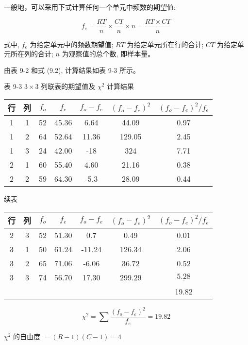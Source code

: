\documentclass[10pt]{article}
\begin{document}
\begin{CJK*}{UTF8}{bsmi}
一般地，可以采用下式计算任何一个单元中频数的期望值:


\begin{equation*}
f_{e}=\frac{R T}{n} \times \frac{C T}{n} \times n=\frac{R T \times C T}{n} \tag{9.2}
\end{equation*}


式中, $f_{e}$ 为给定单元中的频数期望值; $R T$ 为给定单元所在行的合计; $C T$ 为给定单元所在列的合计; $n$ 为观察值的总个数, 即样本量。

由表 9-2 和式 (9.2), 计算结果如表 9-3 所示。

表 9-3 $3 \times 3$ 列联表的期望值及 $\chi^{2}$ 计算结果

\begin{center}
\begin{tabular}{ccccccc}
\hline
行 & 列 & $f_{o}$ & $f_{e}$ & $f_{o}-f_{e}$ & $\left(f_{o}-f_{e}\right)^{2}$ & $\left(f_{o}-f_{e}\right)^{2} / f_{e}$ \\
\hline
1 & 1 & 52 & 45.36 & 6.64 & 44.09 & 0.97 \\
1 & 2 & 64 & 52.64 & 11.36 & 129.05 & 2.45 \\
1 & 3 & 24 & 42.00 & -18 & 324 & 7.71 \\
2 & 1 & 60 & 55.40 & 4.60 & 21.16 & 0.38 \\
2 & 2 & 59 & 64.30 & -5.3 & 28.09 & 0.44 \\
\hline
\end{tabular}
\end{center}

续表

\begin{center}
\begin{tabular}{ccccccc}
\hline
行 & 列 & $f_{o}$ & $f_{e}$ & $f_{o}-f_{e}$ & $\left(f_{o}-f_{e}\right)^{2}$ & $\left(f_{o}-f_{e}\right)^{2} / f_{e}$ \\
\hline
2 & 3 & 52 & 51.30 & 0.7 & 0.49 & 0.01 \\
3 & 1 & 50 & 61.24 & -11.24 & 126.34 & 2.06 \\
3 & 2 & 65 & 71.06 & -6.06 & 36.72 & 0.52 \\
3 & 3 & 74 & 56.70 & 17.30 & 299.29 & $\underline{5.28}$ \\
 &  &  &  &  &  & 19.82 \\
\hline
\end{tabular}
\end{center}

$$
\chi^{2}=\sum \frac{\left(f_{o}-f_{e}\right)^{2}}{f_{e}}=19.82
$$

$\chi^{2}$ 的自由度 $=(R-1)(C-1)=4$


\end{CJK*}
\end{document}

